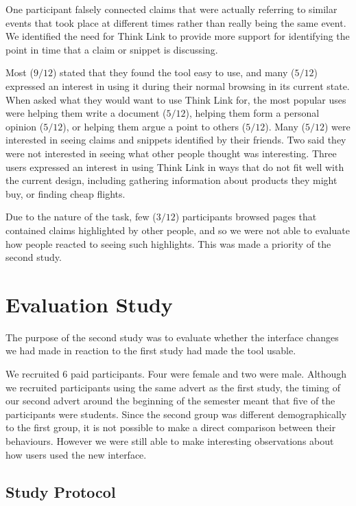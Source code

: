\documentclass{chi2009}
\newcommand{\todo}[1]{}
\begin{document}
One participant falsely connected claims that were actually referring to similar events that took place at different times rather than really being the same event. We identified the need for Think Link to provide more support for identifying the point in time that a claim or snippet is discussing.

Most ($9/12$) stated that they found the tool easy to use, and many ($5/12$) expressed an interest in using it during their normal browsing in its current state. When asked what they would want to use Think Link for, the most popular uses were helping them write a document ($5/12$), helping them form a personal opinion ($5/12$), or helping them argue a point to others ($5/12$). Many ($5/12$) were interested in seeing claims and snippets identified by their friends. Two said they were not interested in seeing what other people thought was interesting. Three users expressed an interest in using Think Link in ways that do not fit well with the current design, including gathering information about products they might buy, or finding cheap flights.

Due to the nature of the task, few ($3/12$) participants browsed pages that contained claims highlighted by other people, and so we were not able to evaluate how people reacted to seeing such highlights. This was made a priority of the second study.

\todo{mention people not being sure how broad a topic should be}
\todo{mention people creating claim in one topic and not being found in other related topics}


\section{Evaluation Study}

The purpose of the second study was to evaluate whether the interface changes we had made in reaction to the first study had made the tool usable. 

We recruited 6 paid participants. Four were female and two were male. Although we recruited participants using the same advert as the first study, the timing of our second advert around the beginning of the semester meant that five of the participants were students. Since the second group was different demographically to the first group, it is not possible to make a direct comparison between their behaviours. However we were still able to make interesting observations about how users used the new interface.

\subsection{Study Protocol}
\end{document}
